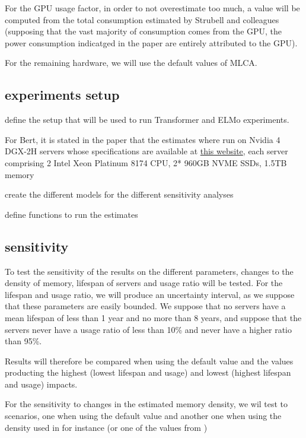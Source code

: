 \documentclass[11pt]{article}
\begin{document}
For the GPU usage factor, in order to not overestimate too much, a
value will be computed from the total consumption estimated by
Strubell and colleagues (supposing that the vast majority of
consumption comes from the GPU, the power consumption indicatged in
the paper are entirely attributed to the GPU).

For the remaining hardware, we will use the default values of MLCA.

\subsection{experiments setup}
\label{sec:org43f273c}

define the setup that will be used to run Transformer and ELMo
experiments.   

For Bert, it is stated in the paper that the estimates where run on
Nvidia 4 DGX-2H servers whose specifications are available at \href{https://www.nvidia.com/content/dam/en-zz/es\_em/Solutions/Data-Center/dgx-2/dgx-2h-datasheet-us-nvidia-841283-r6-web.pdf}{this
website}, each server comprising 2 Intel Xeon Platinum 8174 CPU, 2*
960GB NVME SSDs, 1.5TB memory 

create the different models for the different sensitivity analyses

define functions to run the estimates

\subsection{sensitivity}
\label{sec:orgd9f1b57}

To test the sensitivity of the results on the different parameters,
changes to the density of memory, lifespan of servers and usage ratio
will be tested. For the lifespan and usage ratio, we will produce an
uncertainty interval, as we suppose that these parameters are easily
bounded.
We suppose that no servers have a mean lifespan of less than 1 year
and no more than 8 years, and suppose that the servers never have a
usage ratio of less than 10\% and never have a higher ratio than 95\%.

Results will therefore be compared when using the default value and
the values producting the highest (lowest lifespan and usage) and lowest
(highest lifespan and usage) impacts.

For the sensitivity to changes in the estimated memory density, we wil
test to scenarios, one when using the default value and another one
when using the density used in \cite{Pirson2023iot} for instance (or
one of the values from \cite{Groger2021green}) 
\end{document}
